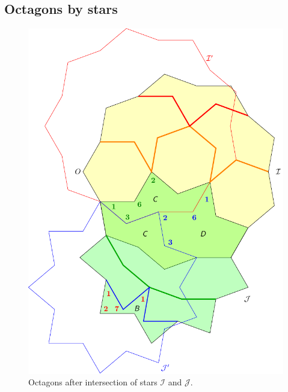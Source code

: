 \documentclass[11pt]{article}
\begin{document}
\subsection{Octagons by stars}

\begin{figure}[H]
\centering
\includegraphics[scale=1]{octagons-9}
\caption{Octagons after intersection of stars $\mathcal{I}$ and $\mathcal{J}$.}
\label{fig:octagons-9}
\end{figure}

\end{document}
